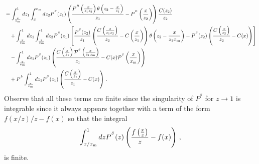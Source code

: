 \documentclass[a4paper]{article}
\newcommand{\PR}[0]{P^{^R}}
\newcommand{\PS}[0]{P^{^S}}
\newcommand{\PmS}[0]{\mathcal{P}^{^S}}
\newcommand{\PL}[0]{P^{^L}}
\newcommand{\xm}[0]{x_{\rm m}}
\newcommand{\zo}[0]{{z_1}}
\newcommand{\zt}[0]{{z_2}}
\begin{document}
\begin{equation}
	\begin{split}
		&= \int_{\frac{x}{\xm}}^1dz_1 \int_x^{\xm}dz_2\PS(\zo)\left(\frac{\PR\left(\frac{x}{\zo \zt}\right)\theta\left(\zt-\frac{x}{\zo}\right)}{\zo} - \PR\left(\frac{x}{\zt} \right)\right)\frac{C(\zt)}{\zt} \\
		&\quad +\int_{\frac{x}{\xm}}^1dz_1 \int_{\frac{x}{\xm}}^1dz_2 \PS(\zo) \left[ \frac{\PS(\zt)}{\zo}\left(\frac{C\left(\frac{x}{\zo \zt}\right)}{\zt}-C\left(\frac{x}{\zo}\right) \right)\theta\left(\zt - \frac{x}{\zo \xm}\right) - \PS(\zt)\left(\frac{C\left(\frac{x}{\zt}\right)}{\zt}-C(x) \right)\right] \\
		& \quad - \int_\frac{x}{\xm}^1 d\zo\PS(\zo)\left(\frac{C\left(\frac{x}{\zo}\right)\PmS\left(\frac{x}{\zo \xm}\right)}{\zo} - C(x) \PmS\left(\frac{x}{\xm}\right) \right) \\
		&\quad +\PL \int_\frac{x}{\xm}^1 d\zo \PS(\zo)\left(\frac{C\left(\frac{x}{\zo}\right)}{\zo}-C(x)\right) \,.
	\end{split}
\end{equation}
Observe that all these terms  are finite since the singularity of $\PS$ for $z \rightarrow 1$ is integrable since it always appears together with a term of the form $f(x/z) /z-f(x)$ so that the integral
\begin{equation*}
	\int_{x/\xm}^1dz\PS(z)\left(\frac{f\left(\frac{x}{z}\right)}{z}-f(x)\right)\,,
\end{equation*}
is finite.
\end{document}
